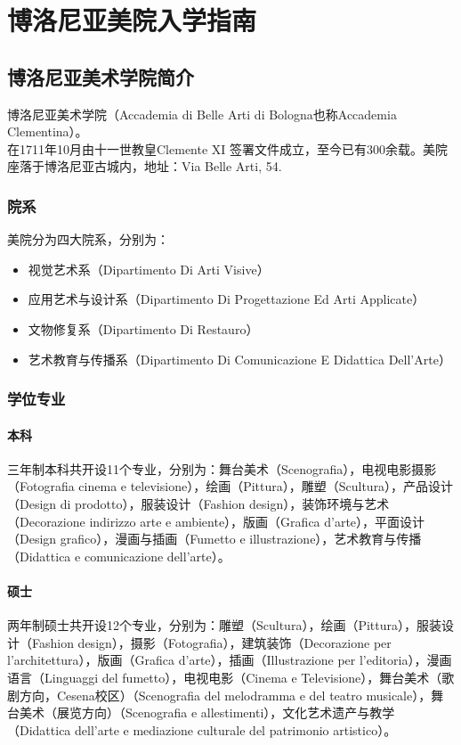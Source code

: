 \chapter{博洛尼亚美院入学指南}              


\section{博洛尼亚美术学院简介}
博洛尼亚美术学院（Accademia di Belle Arti di Bologna也称Accademia Clementina）。\\
在1711年10月由十一世教皇Clemente XI 签署文件成立，至今已有300余载。美院座落于博洛尼亚古城内，地址：Via Belle Arti, 54.

\subsection{院系}
美院分为四大院系，分别为：

\begin{itemize}
\item 视觉艺术系（Dipartimento Di Arti Visive）
\item 应用艺术与设计系（Dipartimento Di Progettazione Ed Arti Applicate）
\item 文物修复系（Dipartimento Di Restauro）
\item 艺术教育与传播系（Dipartimento Di Comunicazione E Didattica Dell’Arte）
\end{itemize}

\subsection{学位专业}

\subsubsection{本科}
三年制本科共开设11个专业，分别为：舞台美术（Scenografia），电视电影摄影（Fotografia cinema e televisione），绘画（Pittura），雕塑（Scultura），产品设计（Design di prodotto），服装设计（Fashion design），装饰环境与艺术（Decorazione indirizzo arte e ambiente），版画（Grafica d’arte），平面设计（Design grafico），漫画与插画（Fumetto e illustrazione），艺术教育与传播（Didattica e comunicazione dell’arte）。
      
\subsubsection{硕士}
两年制硕士共开设12个专业，分别为：雕塑（Scultura），绘画（Pittura），服装设计（Fashion design），摄影（Fotografia），建筑装饰（Decorazione per l’architettura），版画（Grafica d’arte），插画（Illustrazione per l’editoria），漫画语言（Linguaggi del fumetto），电视电影（Cinema e Televisione），舞台美术（歌剧方向，Cesena校区）（Scenografia del melodramma e del teatro musicale），舞台美术（展览方向）（Scenografia e allestimenti），文化艺术遗产与教学（Didattica dell’arte e mediazione culturale del patrimonio artistico）。


